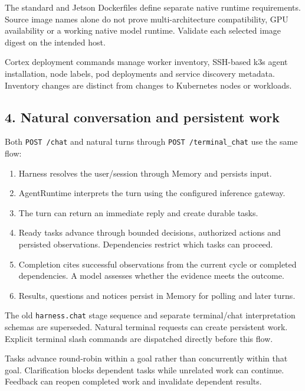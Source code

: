 \documentclass[
  10pt,
]{article}
\providecommand{\tightlist}{%
  \setlength{\itemsep}{0pt}\setlength{\parskip}{0pt}}
\begin{document}
The standard and Jetson Dockerfiles define separate native runtime
requirements. Source image names alone do not prove multi-architecture
compatibility, GPU availability or a working native model runtime.
Validate each selected image digest on the intended host.

Cortex deployment commands manage worker inventory, SSH-based k3s agent
installation, node labels, pod deployments and service discovery
metadata. Inventory changes are distinct from changes to Kubernetes
nodes or workloads.

\hypertarget{natural-conversation-and-persistent-work}{%
\subsection{4. Natural conversation and persistent
work}\label{natural-conversation-and-persistent-work}}

Both \texttt{POST\ /chat} and natural turns through
\texttt{POST\ /terminal\_chat} use the same flow:

\begin{enumerate}
\def\labelenumi{\arabic{enumi}.}
\tightlist
\item
  Harness resolves the user/session through Memory and persists input.
\item
  AgentRuntime interprets the turn using the configured inference
  gateway.
\item
  The turn can return an immediate reply and create durable tasks.
\item
  Ready tasks advance through bounded decisions, authorized actions and
  persisted observations. Dependencies restrict which tasks can proceed.
\item
  Completion cites successful observations from the current cycle or
  completed dependencies. A model assesses whether the evidence meets
  the outcome.
\item
  Results, questions and notices persist in Memory for polling and later
  turns.
\end{enumerate}

The old \texttt{harness.chat} stage sequence and separate terminal/chat
interpretation schemas are superseded. Natural terminal requests can
create persistent work. Explicit terminal slash commands are dispatched
directly before this flow.

Tasks advance round-robin within a goal rather than concurrently within
that goal. Clarification blocks dependent tasks while unrelated work can
continue. Feedback can reopen completed work and invalidate dependent
results.
\end{document}
